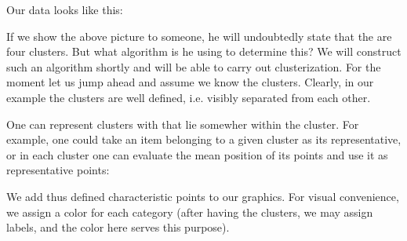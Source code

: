 \documentclass[letterpaper,10pt,english]{jupyterBook}
\begin{document}
\sphinxAtStartPar
Our data looks like this:

\noindent{}

\sphinxAtStartPar
If we show the above picture to someone, he will undoubtedly state that the are four clusters. But what algorithm is he using to determine this? We will construct such an algorithm shortly and will be able to carry out clusterization. For the moment let us jump ahead and assume we know the clusters. Clearly, in our example the clusters are well defined, i.e. visibly separated from each other.

\sphinxAtStartPar
One can represent clusters with  that lie somewher within the cluster. For example, one could take an item belonging to a given cluster as its representative, or in each cluster one can evaluate the mean position of its points and use it as representative points:

\begin{sphinxVerbatim}[commandchars=\\\{\}]
\PYG{p}{[}\PYG{p}{[}\PYG{p}{]}\PYG{p}{[}\PYG{p}{]}\PYG{p}{]}
\PYG{p}{[}\PYG{p}{[}\PYG{p}{]}\PYG{p}{[}\PYG{p}{]}\PYG{p}{]}
\PYG{p}{[}\PYG{p}{[}\PYG{p}{]}\PYG{p}{[}\PYG{p}{]}\PYG{p}{]}
\PYG{p}{[}\PYG{p}{[}\PYG{p}{]}\PYG{p}{[}\PYG{p}{]}\PYG{p}{]}
\end{sphinxVerbatim}

\sphinxAtStartPar
We add thus defined characteristic points to our graphics. For visual convenience, we assign a color for each category (after having the clusters, we may assign labels, and the color here serves this purpose).
\end{document}
